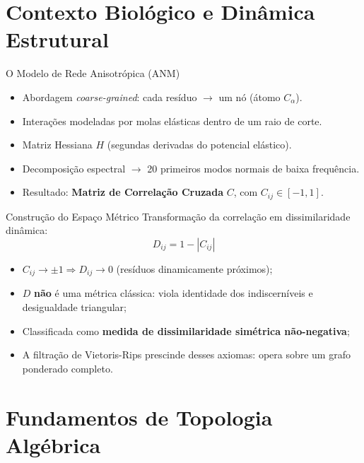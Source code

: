 \documentclass[aspectratio=169]{beamer}
\begin{document}
\section{Contexto Biológico e Dinâmica Estrutural}

\begin{frame}{O Modelo de Rede Anisotrópica (ANM)}
  \begin{itemize}
    \item Abordagem \textit{coarse-grained}: cada resíduo $\to$ um nó (átomo $C_\alpha$).
    \item Interações modeladas por molas elásticas dentro de um raio de corte.
    \item Matriz Hessiana $H$ (segundas derivadas do potencial elástico).
    \item Decomposição espectral $\to$ 20 primeiros modos normais de baixa frequência.
    \item Resultado: \textbf{Matriz de Correlação Cruzada} $C$, com $C_{ij} \in [-1,1]$.
  \end{itemize}
\end{frame}

\begin{frame}{Construção do Espaço Métrico}
  Transformação da correlação em dissimilaridade dinâmica:
  \[
    D_{ij} = 1 - |C_{ij}|
  \]
  \begin{itemize}
    \item $C_{ij} \to \pm 1 \Rightarrow D_{ij} \to 0$ (resíduos dinamicamente próximos);
    \item $D$ \textbf{não} é uma métrica clássica: viola identidade dos indiscerníveis e desigualdade triangular;
    \item Classificada como \textbf{medida de dissimilaridade simétrica não-negativa};
    \item A filtração de Vietoris-Rips prescinde desses axiomas: opera sobre um grafo ponderado completo.
  \end{itemize}
\end{frame}

\section{Fundamentos de Topologia Algébrica}
\end{document}
